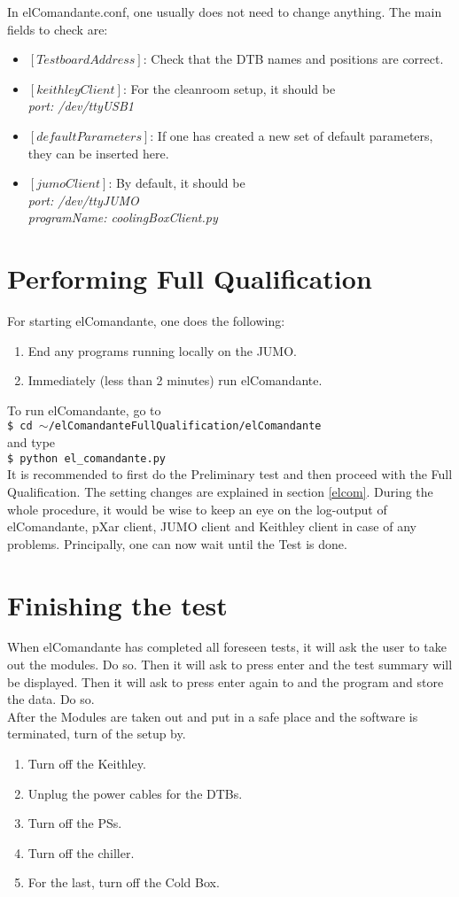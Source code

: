 \documentclass[fleqn,10pt]{SelfArx} %
\newcommand{\shellcmd}[1]{\\\indent\indent\texttt{\footnotesize\$ #1}\\}
\begin{document}
In elComandante.conf, one usually does not need to change anything. The main fields to check are:
\begin{itemize}
\item $[TestboardAddress]$: Check that the DTB names and positions are correct.
\item $[keithleyClient]$: For the cleanroom setup, it should be\\
{\it port: /dev/ttyUSB1}
\item $[defaultParameters]$: If one has created a new set of default parameters, they can be inserted here.
\item $[jumoClient]$: By default, it should be\\
{\it port: /dev/ttyJUMO\\programName: coolingBoxClient.py}
\end{itemize}

\section{Performing Full Qualification}
For starting elComandante, one does the following:
\begin{enumerate}
\item End any programs running locally on the JUMO. 
\item Immediately (less than 2 minutes) run elComandante.
\end{enumerate}
To run elComandante, go to 
\shellcmd{cd $\sim$/elComandanteFullQualification/elComandante}
and type
\shellcmd{python el\_comandante.py}

It is recommended to first do the Preliminary test and then proceed with the Full Qualification. The setting changes are explained in section \ref{elcom}. During the whole procedure, it would be wise to keep an eye on the log-output of elComandante, pXar client, JUMO client and Keithley client in case of any problems. Principally, one can now wait until the Test is done. 

\newpage
\section{Finishing the test}
When elComandante has completed all foreseen tests, it will ask the user to take out the modules. Do so. Then it will ask to press enter and the test summary will be displayed. Then it will ask to press enter again to and the program and store the data. Do so. \\
After the Modules are taken out and put in a safe place and the software is terminated, turn of the setup by.
\begin{enumerate}
\item Turn off the Keithley.
\item Unplug the power cables for the DTBs.
\item Turn off the PSs.
\item Turn off the chiller.
\item For the last, turn off the Cold Box.
\end{enumerate}
\end{document}
